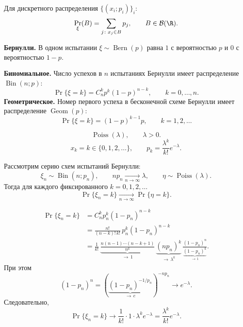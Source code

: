 Для дискретного распределения $\{(x_i;p_i)\}_i$:
\[
    \Pr_\xi(B)=\sum_{j\colon x_j\in B}p_j,
    \qquad B\in\mathcal{B}(\R).
\]

\begin{example}
\textbf{Бернулли.} В одном испытании $\xi\sim\operatorname{Bern}(p)$ равна $1$ с вероятностью $p$ и $0$ с вероятностью $1-p$.

\smallskip
\textbf{Биномиальное.} Число успехов в $n$ испытаниях Бернулли имеет распределение $\operatorname{Bin}(n;p)$:
\[
 \Pr\{\xi=k\}=C_n^k p^k(1-p)^{n-k},\qquad k=0,\ldots,n.
\]
\textbf{Геометрическое.} Номер первого успеха в бесконечной схеме Бернулли имеет распределение $\operatorname{Geom}(p)$:
\[
 \Pr\{\xi=k\}=(1-p)^{k-1}p,\qquad k=1,2,\ldots
\]
\end{example}


\begin{definition}
    \[
        \operatorname{Poiss}(\lambda),\qquad\lambda>0.
    \]
    \[
        x_k=k\in\{0,1,2,\ldots\},\qquad
        p_k=\frac{\lambda^k}{k!}e^{-\lambda}.
    \]
\end{definition}

\begin{theorem}
    Рассмотрим серию схем испытаний Бернулли:
    \[
        \xi_n\sim\operatorname{Bin}(n;p_n),\qquad
        np_n\xrightarrow[n\to\infty]{}\lambda,\qquad
        \eta\sim\operatorname{Poiss}(\lambda).
    \]
    Тогда для каждого фиксированного $k=0,1,2,\ldots$
    \[
        \Pr\{\xi_n=k\}\xrightarrow[n\to\infty]{}\Pr\{\eta=k\}.
    \]
\end{theorem}

\begin{Proof}
    \[
        \begin{aligned}
            \Pr\{\xi_n=k\}
            &=C_n^k p_n^k(1-p_n)^{n-k}\\
            &=\frac{n!}{(n-k)!\,k!}\,p_n^k(1-p_n)^{n-k}\\
            &=\frac1{k!}\,
              \underbrace{\frac{n(n-1)\cdots(n-k+1)}{n^k}}
              _{\longrightarrow\,1}\,
              \underbrace{(np_n)^k}_{\longrightarrow\,\lambda^k}\,
              \frac{(1-p_n)^n}
              {\underbrace{(1-p_n)^k}_{\longrightarrow\,1}}.
        \end{aligned}
    \]
    При этом
    \[
        (1-p_n)^n
        =\left(\underbrace{(1-p_n)^{-1/p_n}}
        _{\longrightarrow\,e}\right)^{-np_n}
        \longrightarrow e^{-\lambda}.
    \]
    Следовательно,
    \[
        \Pr\{\xi_n=k\}\longrightarrow
        \frac1{k!}\cdot1\cdot\lambda^k e^{-\lambda}
        =\frac{\lambda^k}{k!}e^{-\lambda}.
    \]
\end{Proof}

